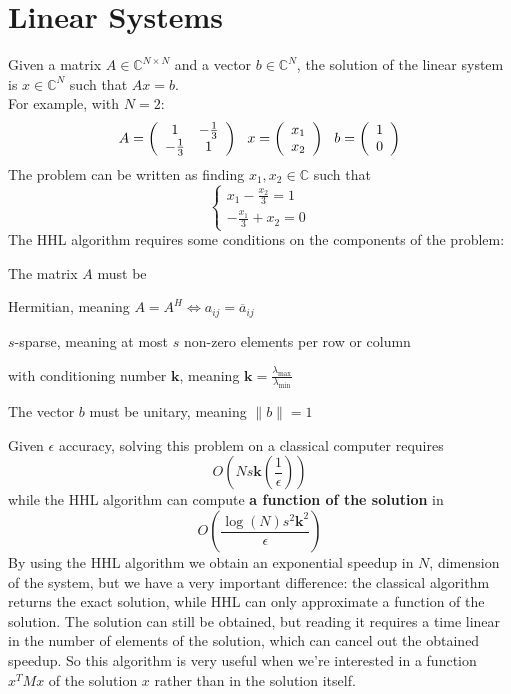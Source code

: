 \documentclass[10pt]{article}
\begin{document}
\section{Linear Systems}
Given a matrix $A \in \mathbb{C}^{N\times N}$ and a vector $b\in \mathbb{C}^{N}$, the solution of the linear system is $x\in \mathbb{C}^{N}$ such that $Ax = b$.\\
For example, with $N=2$:
$$A=\left(\begin{array}{c c}
1&-\frac{1}{3}\\-\frac{1}{3}&1
\end{array}\right)\:\:\:x=\left(\begin{array}{c}
x_1\\x_2
\end{array}\right)\:\:\:b=\left(\begin{array}{c}
1\\0
\end{array}\right)$$
The problem can be written as finding $x_1,x_2\in\mathbb{C}$ such that
$$\left\{\begin{array}{l}
\displaystyle x_1-\frac{x_2}{3}=1\\
\displaystyle -\frac{x_1}{3}+x_2=0
\end{array}\right.$$
The HHL algorithm requires some conditions on the components of the problem:
\begin{list}{}{}
	\item The matrix $A$ must be
	\begin{list}{}{}
		\item Hermitian, meaning $A = A^H \Leftrightarrow a_{ij} = \overline{a}_{ij}$
		\item $s$-sparse, meaning at most $s$ non-zero elements per row or column
		\item with conditioning number $\mathbf{k}$, meaning $\mathbf{k}=\frac{\lambda_{\text{max}}}{\lambda_{\text{min}}}$
	\end{list}
	\item The vector $b$ must be unitary, meaning $\|b\|=1$
\end{list}
Given $\epsilon$ accuracy, solving this problem on a classical computer requires $$O\left(Ns\mathbf{k}\left(\frac{1}{\epsilon}\right)\right)$$ while the HHL algorithm can compute \textbf{a function of the solution} in $$O\left(\frac{\log(N)s^2\mathbf{k}^2}{\epsilon}\right)$$
By using the HHL algorithm we obtain an exponential speedup in $N$, dimension of the system, but we have a very important difference: the classical algorithm returns the exact solution, while HHL can only approximate a function of the solution. The solution can still be obtained, but reading it requires a time linear in the number of elements of the solution, which can cancel out the obtained speedup. So this algorithm is very useful when we're interested in a function $x^TMx$ of the solution $x$ rather than in the solution itself.
\end{document}

